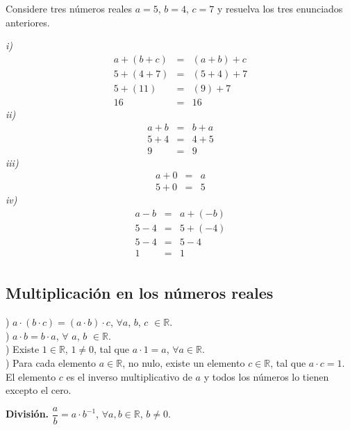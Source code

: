 \begin{myexample}
Considere tres números reales $a=5$, $b=4$, $c=7$ y resuelva los tres enunciados anteriores.
\end{myexample}
\noindent\textit{i)}
\begin{eqnarray*}
a+(b+c)&=&(a+b)+c\\
5+(4+7)&=&(5+4)+7\\
5+(11)&=&(9)+7\\
16&=&16
\end{eqnarray*}
\noindent\textit{ii)}
\begin{eqnarray*}
a+b&=&b+a\\
5+4&=&4+5\\
9&=&9
\end{eqnarray*}
\noindent\textit{iii)}
\begin{eqnarray*}
a+0&=&a\\
5+0&=&5
\end{eqnarray*}
\noindent\textit{iv)}
\begin{eqnarray*}
a-b&=&a+(-b)\\
5-4&=&5+(-4)\\
5-4&=&5-4\\
1&=&1\\
\end{eqnarray*}

\subsection{Multiplicación en los números reales}
) $a\cdot(b\cdot c)=(a\cdot b)\cdot c$, $\forall a$, $b$, $c$ $\in \mathbb{R}$.\\

) $a\cdot b=b\cdot a$, $\forall$ $a$, $b$ $\in\mathbb{R}$.\\

) Existe $1\in\mathbb{R}$, $1\neq 0$, tal que $a\cdot 1=a$, $\forall a\in\mathbb{R}$.\\

) Para cada elemento $a\in\mathbb{R}$, no nulo, existe un elemento $c\in\mathbb{R}$, tal que $a\cdot c=1$. El elemento $c$ es el inverso multiplicativo de $a$ y todos los números lo tienen excepto el cero.\\

\begin{mydef}
\textbf{División.} $\dfrac{a}{b}=a\cdot b^{-1}$, $\forall a,b\in\mathbb{R}$, $b\neq 0$.
\end{mydef}

